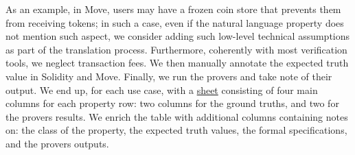 As an example, in Move, users may have a frozen coin store that prevents them from receiving tokens; in such a case, even if the natural language property does not mention such aspect, we consider adding such low-level technical assumptions as part of the translation process. 
%
Furthermore, coherently with most verification tools,
we neglect transaction fees.
We then manually annotate the expected truth value in Solidity and Move.
%
Finally, we run the provers and take note of their output.
We end up, for each use case, with a \href{\sheeturl}{sheet} consisting of four main columns for each property row: two columns for the ground truths, and two for the provers results. We enrich the table with additional columns containing notes on: the class of the property, the expected truth values, the formal specifications, and the provers outputs.   








